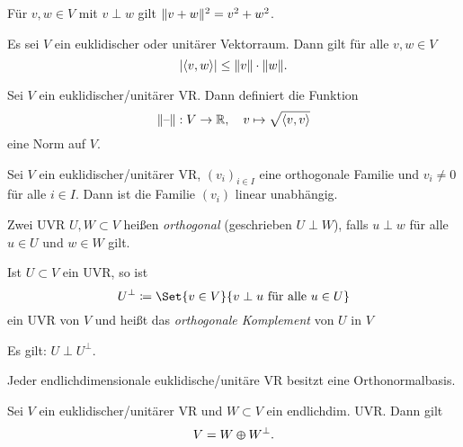 \documentclass{cheat-sheet}
\begin{document}
\begin{satz}
  Für $v, w \in V$ mit $v \perp w$ gilt $\lVert v + w\rVert^2 = {v}^2 + {w}^2$.
\end{satz}

\begin{satz}
  Es sei $V$ ein euklidischer oder unitärer Vektorraum. Dann gilt für alle $v, w \in V$
  \[ \lvert\langle v, w \rangle\rvert \le \lVert v\rVert \cdot \lVert w\rVert. \]
\end{satz}

\begin{satz}
  Sei $V$ ein euklidischer/unitärer VR. Dann definiert die Funktion
  \[ \lVert\text{--}\rVert : V \to \mathbb{R}, \quad v \mapsto \sqrt{ \langle v , v \rangle } \]
  eine Norm auf $V$.
\end{satz}

\begin{satz}
  Sei $V$ ein euklidischer/unitärer VR, $(v_i)_{i \in I}$ eine orthogonale Familie und $v_i \not= 0$ für alle $i \in I$. Dann ist die Familie $(v_i)$ linear unabhängig.
\end{satz}

\begin{defn}
  Zwei UVR $U, W \subset V$ heißen \emph{orthogonal} (geschrieben $U \perp W$), falls $u \perp w$ für alle $u \in U$ und $w \in W$ gilt.
\end{defn}

\begin{defn}
  Ist $U \subset V$ ein UVR, so ist
  \[ U^{\perp} \coloneqq \Set{ v \in V }{ v \perp u \text{ für alle } u \in U } \]
  ein UVR von $V$ und heißt das \emph{orthogonale Komplement} von $U$ in $V$
\end{defn}

\begin{bem}
  Es gilt: $U \perp U^{\perp}$.
\end{bem}

\begin{satz}
  Jeder endlichdimensionale euklidische/unitäre VR besitzt eine Orthonormalbasis.
\end{satz}


\begin{kor}
  Sei $V$ ein euklidischer/unitärer VR und $W \subset V$ ein endlichdim. UVR. Dann gilt
  \[ V = W \varoplus W^{\perp}. \]
\end{kor}
\end{document}

